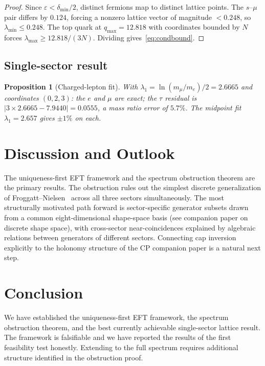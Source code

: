 ﻿\documentclass[11pt]{article}
\newtheorem{proposition}[theorem]{Proposition}
\begin{document}
\begin{proof}
Since $\varepsilon<\delta_{\min}/2$, distinct fermions map to distinct
lattice points. The $s$--$\mu$ pair differs by $0.124$, forcing a nonzero
lattice vector of magnitude $<0.248$, so $\lambda_{\min}\leq0.248$. The
top quark at $q_{\max}=12.818$ with coordinates bounded by $N$ forces
$\lambda_{\max}\geq12.818/(3N)$. Dividing gives~\eqref{eq:condbound}.
\end{proof}

\subsection{Single-sector result}

\begin{proposition}[Charged-lepton fit]\label{prop:leptons}
With $\lambda_1=\ln(m_\mu/m_e)/2=2.6665$ and coordinates $(0,2,3)$:
the $e$ and $\mu$ are exact; the $\tau$ residual is
$|3\times2.6665-7.9440|=0.0555$, a mass ratio error of $5.7\%$.
The midpoint fit $\lambda_1=2.657$ gives $\pm1\%$ on each.
\end{proposition}

\section{Discussion and Outlook}

The uniqueness-first EFT framework and the spectrum obstruction theorem are
the primary results. The obstruction rules out the simplest discrete
generalization of Froggatt--Nielsen~\cite{FroggattNielsen} across all three
sectors simultaneously. The most structurally motivated path forward is
sector-specific generator subsets drawn from a common eight-dimensional
shape-space basis (see companion paper on discrete shape space), with
cross-sector near-coincidences explained by algebraic relations between
generators of different sectors. Connecting cap inversion explicitly to the
holonomy structure of the CP companion paper is a natural next step.

\section{Conclusion}

We have established the uniqueness-first EFT framework, the spectrum
obstruction theorem, and the best currently achievable single-sector
lattice result. The framework is falsifiable and we have reported the
results of the first feasibility test honestly. Extending to the full
spectrum requires additional structure identified in the obstruction proof.



\end{document}
